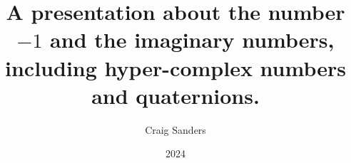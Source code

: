 \documentclass[t]{beamer}
\title{A presentation about the number \(-1\) and the imaginary numbers, including hyper-complex numbers and quaternions.}
\author{Craig Sanders}
\institute{Gravitas Toolworks}
\date{2024}
\begin{document}

\frame{\titlepage}








\end{document}
